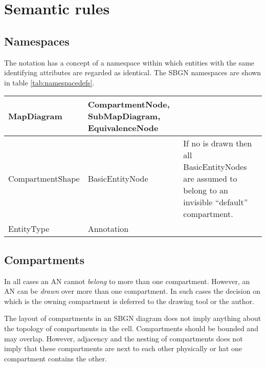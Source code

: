 \section{Semantic rules}

\subsection{Namespaces}

The notation has a concept of a namespace within which entities with the same identifying attributes are regarded as identical. The SBGN namespaces are shown
in table \ref{tab:namespacedefs}.

\begin{center}
\label{tab:namespacedefs}
\begin{small}
\tablelasttail{\hline}
\begin{supertabular}{|l|p{5cm}|p{5cm}|}\hline
%
MapDiagram & CompartmentNode, SubMapDiagram, EquivalenceNode & \\\hline
%
CompartmentShape & BasicEntityNode & If no  is drawn then all BasicEntityNodes are assumed to belong to an invisible ``default'' compartment.\\\hline
EntityType & Annotation & \\\hline
\end{supertabular}
\end{small}
\end{center}

\subsection{Compartments}

In all cases an AN cannot \emph{belong} to more than one compartment. However, an AN can be \emph{drawn} over more than one compartment. In such cases the decision on which is the owning compartment is deferred to the drawing tool or the author. 

The layout of compartments in an SBGN diagram does not imply anything about the topology of compartments in the cell. Compartments should be bounded and may overlap. However, adjacency and the nesting of compartments does not imply that these compartments are next to each other physically or hat one compartment contains the other.

